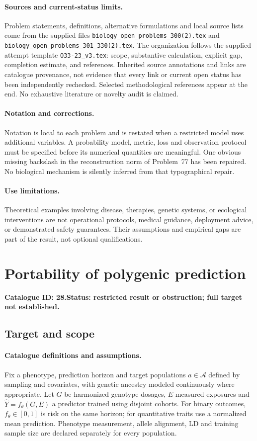 \documentclass[11pt]{article}
\begin{document}
\paragraph{Sources and current-status limits.}
Problem statements, definitions, alternative formulations and local source lists
come from the supplied files
\texttt{biology\_open\_problems\_300(2).tex} and
\texttt{biology\_open\_problems\_301\_330(2).tex}.
The organization follows the supplied attempt template
\texttt{O33-23\_v3.tex}: scope, substantive calculation, explicit gap,
completion estimate, and references. Inherited source annotations and links are
catalogue provenance, not evidence that every link or current open status has
been independently rechecked. Selected methodological references appear at the
end. No exhaustive literature or novelty audit is claimed.

\paragraph{Notation and corrections.}
Notation is local to each problem and is restated when a restricted model uses
additional variables. A probability model, metric, loss and observation protocol
must be specified before its numerical quantities are meaningful. One obvious
missing backslash in the reconstruction norm of Problem~77 has been repaired.
No biological mechanism is silently inferred from that typographical repair.

\paragraph{Use limitations.}
Theoretical examples involving disease, therapies, genetic systems, or ecological
interventions are not operational protocols, medical guidance, deployment advice,
or demonstrated safety guarantees. Their assumptions and empirical gaps are part
of the result, not optional qualifications.

\setcounter{section}{27}
\section{Portability of polygenic prediction}
\label{prob:028}
\noindent\textbf{Catalogue ID: 28.}\quad \textbf{Status: restricted result or obstruction; full target not established.}
\subsection{Target and scope}
\paragraph{Catalogue definitions and assumptions.}
Fix a phenotype, prediction horizon and target populations $a\in\mathcal A$ defined by sampling and covariates, with genetic ancestry modeled continuously where appropriate. Let $G$ be harmonized genotype dosages, $E$ measured exposures and $\widehat Y=f_\theta(G,E)$ a predictor trained using disjoint cohorts. For binary outcomes, $f_\theta\in[0,1]$ is risk on the same horizon; for quantitative traits use a normalized mean prediction. Phenotype measurement, allele alignment, LD and training sample size are declared separately for every population.
\end{document}
